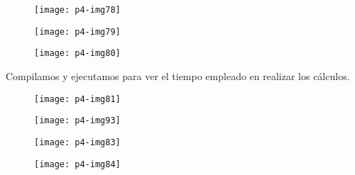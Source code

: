 \documentclass[10pt]{article}
\begin{document}
\begin{figure}[H]
	\begin{center}
 		\texttt{[image: p4-img78]}
	\end{center} 
\end{figure}

\begin{figure}[H]
	\begin{center}
 		\texttt{[image: p4-img79]}
	\end{center} 
\end{figure}

\begin{figure}[H]
	\begin{center}
 		\texttt{[image: p4-img80]}
	\end{center} 
\end{figure}

Compilamos y ejecutamos para ver el tiempo empleado en realizar los cálculos. \\

\begin{figure}[H]
	\begin{center}
 		\texttt{[image: p4-img81]}
	\end{center} 
\end{figure}

\begin{figure}[H]
	\begin{center}
 		\texttt{[image: p4-img93]}
	\end{center} 
\end{figure}

\begin{figure}[H]
	\begin{center}
 		\texttt{[image: p4-img83]}
	\end{center} 
\end{figure}

\begin{figure}[H]
	\begin{center}
 		\texttt{[image: p4-img84]}
	\end{center} 
\end{figure}
\end{document}
